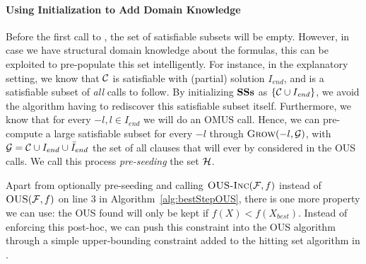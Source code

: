 \paragraph{Using Initialization to Add Domain Knowledge}
Before the first call to \omusinc, the set \satsets of satisfiable subsets will be empty. 
However, in case we have structural domain knowledge about the formulas, this can be exploited to pre-populate this set intelligently. 
For instance, in the explanatory setting, we know that $\mathcal{C} $ is satisfiable with (partial) solution $I_{end}$, and is a satisfiable subset of \emph{all} \omusinc calls to follow. 
By initializing $\mathbf{SSs}$ as $\{\mathcal{C}  \cup I_{\mathit{end}}\}$, we avoid the algorithm having to rediscover this satisfiable subset itself.
Furthermore, we know that for every $-l, l \in I_{end}$ we will do an OMUS call. Hence, we can pre-compute a large satisfiable subset for every $-l$ through $\textsc{Grow}(-l, \mathcal{G} )$, with $\mathcal{G}  = {\cal C} \cup I_{end} \cup \bar{I}_{end}$ the set of all clauses that will ever by considered in the OUS calls. We call this process \textit{pre-seeding} the set $\mathcal{H} $.

Apart from optionally pre-seeding and calling $\textsc{OUS-Inc}(\mathcal{F} ,f)$ instead of $\textsc{OUS}(\mathcal{F} ,f)$ on line 3 in Algorithm~\ref{alg:bestStepOUS}, there is one more property we can use: the OUS found will only be kept if $f(X)<f(X_{best})$. Instead of enforcing this post-hoc, we can push this constraint into the OUS algorithm through a simple upper-bounding constraint added to the hitting set algorithm in \omusinc.



